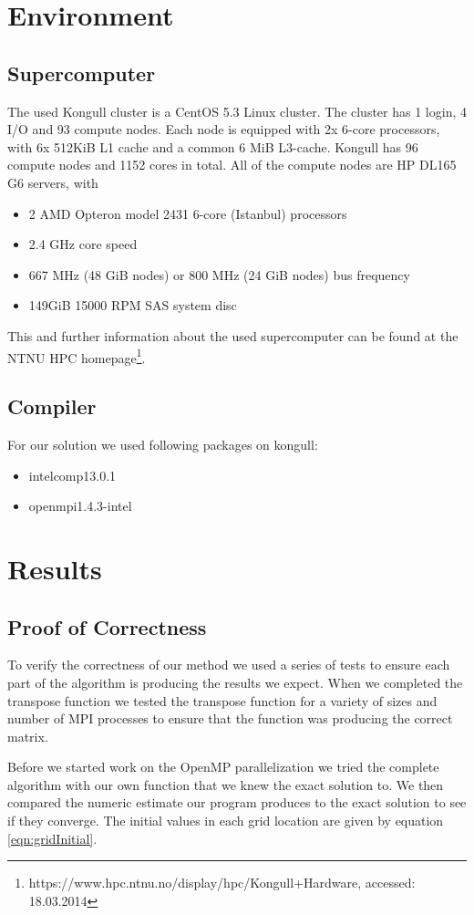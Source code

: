 \documentclass{article}
\begin{document}
\section{Environment}
\subsection{Supercomputer}
The used Kongull cluster is a CentOS 5.3 Linux cluster. The cluster has 1 login, 4 I/O and 93 compute nodes. Each node is equipped with 2x 6-core processors, with 6x 512KiB L1 cache and a common 6 MiB L3-cache. Kongull has 96 compute nodes and 1152 cores in total. All of the compute nodes are HP DL165 G6 servers, with
\begin{itemize}
\item 2 AMD Opteron model 2431 6-core (Istanbul) processors
\item 2.4 GHz core speed
\item 667 MHz (48 GiB nodes) or 800 MHz (24 GiB nodes) bus frequency
\item 149GiB 15000 RPM SAS system disc
\end{itemize}
This and further information about the used supercomputer can be found at the NTNU HPC homepage\footnote{https://www.hpc.ntnu.no/display/hpc/Kongull+Hardware, accessed: 18.03.2014}.
\subsection{Compiler}

For our solution we used following packages on kongull:
\begin{itemize}
\item intelcomp13.0.1
\item openmpi1.4.3-intel
\end{itemize}
\section{Results}
\subsection{Proof of Correctness}
	To verify the correctness of our method we used a series of tests to ensure each part of the algorithm is producing the results we expect. When we completed the transpose function we tested the transpose function for a variety of sizes and number of MPI processes to ensure that the function was producing the correct matrix. 

	Before we started work on the OpenMP parallelization we tried the complete algorithm with our own function that we knew the exact solution to. We then compared the numeric estimate our program produces to the exact solution to see if they converge. The initial values in each grid location are given by equation \ref{eqn:gridInitial}.
\end{document}
